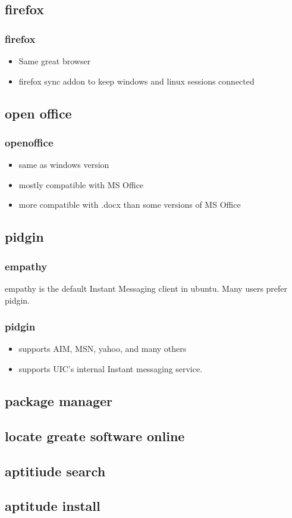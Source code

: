 \documentclass[hyperref={pdfpagelabels=false}]{beamer}
\begin{document}
\subsection{firefox}
\frame
{
    \frametitle{firefox}
    \begin{itemize}
    \item{Same great browser}
    \item{firefox sync addon to keep windows and linux sessions connected}
    \end{itemize}
}
\subsection{open office}
\frame
{
    \frametitle{openoffice}
    \begin{itemize}
    \item{same as windows version}
    \item{mostly compatible with MS Office}
    \item{more compatible with .docx than some versions of MS Office}
    \end{itemize}
}
\subsection{pidgin}
\frame
{
	\frametitle{empathy}
	empathy is the default Instant Messaging client in ubuntu.
        Many users prefer pidgin.
}
\frame
{
	\frametitle{pidgin}
	\begin{itemize}
	\item{supports AIM, MSN, yahoo, and many others}
	\item{supports UIC's internal Instant messaging service.}
	\end{itemize}
}
\subsection{package manager}
\subsection{locate greate software online}
\subsection{aptitiude search}
\subsection{aptitude install}
\end{document}
